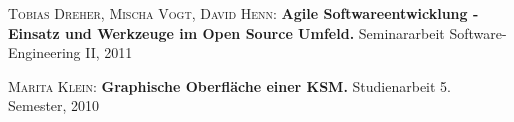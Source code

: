 \begin{thebibliography}{---}

    \textsc{Tobias Dreher, Mischa Vogt, David Henn:}
    \textbf{Agile Softwareentwicklung - Einsatz und Werkzeuge im Open Source Umfeld.}
    Seminararbeit Software-Engineering II, 2011
    
    \textsc{Marita Klein:}
    \textbf{Graphische Oberfläche einer KSM.}
    Studienarbeit 5. Semester, 2010
    


\end{thebibliography}

